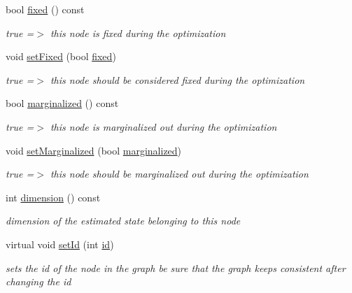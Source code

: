\begin{DoxyCompactItemize}
bool \mbox{\hyperlink{classg2o_1_1_optimizable_graph_1_1_vertex_a97294e6a1a573a44fe82ba36fc52c619}{fixed}} () const
\begin{DoxyCompactList}\small\item\em true =$>$ this node is fixed during the optimization \end{DoxyCompactList}\item 
void \mbox{\hyperlink{classg2o_1_1_optimizable_graph_1_1_vertex_af92ef49e1bcd6a8166afa151d367b905}{set\+Fixed}} (bool \mbox{\hyperlink{classg2o_1_1_optimizable_graph_1_1_vertex_a97294e6a1a573a44fe82ba36fc52c619}{fixed}})
\begin{DoxyCompactList}\small\item\em true =$>$ this node should be considered fixed during the optimization \end{DoxyCompactList}\item 
bool \mbox{\hyperlink{classg2o_1_1_optimizable_graph_1_1_vertex_a216d79149edcfa9f666140205159fde8}{marginalized}} () const
\begin{DoxyCompactList}\small\item\em true =$>$ this node is marginalized out during the optimization \end{DoxyCompactList}\item 
void \mbox{\hyperlink{classg2o_1_1_optimizable_graph_1_1_vertex_afabf1782886c78bf7b312bb1f2c90524}{set\+Marginalized}} (bool \mbox{\hyperlink{classg2o_1_1_optimizable_graph_1_1_vertex_a216d79149edcfa9f666140205159fde8}{marginalized}})
\begin{DoxyCompactList}\small\item\em true =$>$ this node should be marginalized out during the optimization \end{DoxyCompactList}\item 
int \mbox{\hyperlink{classg2o_1_1_optimizable_graph_1_1_vertex_a86feed80301950b100142575b48e4fca}{dimension}} () const
\begin{DoxyCompactList}\small\item\em dimension of the estimated state belonging to this node \end{DoxyCompactList}\item 
virtual void \mbox{\hyperlink{classg2o_1_1_optimizable_graph_1_1_vertex_ac57651173d6ce4bb4eebf8cb1d917551}{set\+Id}} (int \mbox{\hyperlink{classg2o_1_1_hyper_graph_1_1_vertex_a48191960395856d1b686287489e53da3}{id}})
\begin{DoxyCompactList}\small\item\em sets the id of the node in the graph be sure that the graph keeps consistent after changing the id \end{DoxyCompactList}\item 

\end{DoxyCompactItemize}
